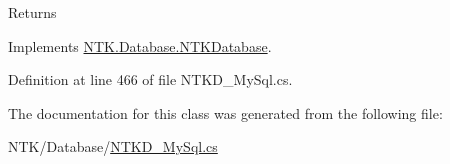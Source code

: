 \begin{DoxyReturn}{Returns}

\end{DoxyReturn}


Implements \mbox{\hyperlink{class_n_t_k_1_1_database_1_1_n_t_k_database_a59d2820fbd047c1b11c73aabbf390ebb}{N\+T\+K.\+Database.\+N\+T\+K\+Database}}.



Definition at line 466 of file N\+T\+K\+D\+\_\+\+My\+Sql.\+cs.



The documentation for this class was generated from the following file\+:\begin{DoxyCompactItemize}
\item 
N\+T\+K/\+Database/\mbox{\hyperlink{_n_t_k_d___my_sql_8cs}{N\+T\+K\+D\+\_\+\+My\+Sql.\+cs}}\end{DoxyCompactItemize}
